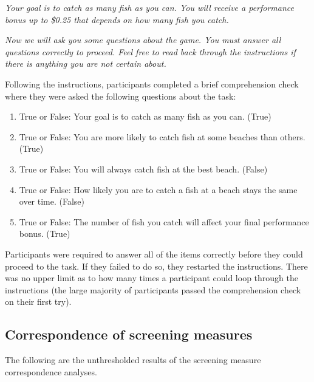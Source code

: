 \documentclass[a4paper,notitlepage,12pt]{article}
\begin{document}
\textit{Your goal is to catch as many fish as you can. You will receive a performance bonus up to \$0.25 that depends on how many fish you catch.}

\textit{Now we will ask you some questions about the game. You must answer all questions correctly to proceed. Feel free to read back through the instructions if there is anything you are not certain about.}

Following the instructions, participants completed a brief comprehension check where they were asked the following questions about the task:

\begin{enumerate}
    \item True or False: Your goal is to catch as many fish as you can. (True)
    \item True or False: You are more likely to catch fish at some beaches than others. (True)
    \item True or False: You will always catch fish at the best beach. (False)
    \item True or False: How likely you are to catch a fish at a beach stays the same over time. (False)
    \item True or False: The number of fish you catch will affect your final performance bonus. (True)
\end{enumerate}

Participants were required to answer all of the items correctly before they could proceed to the task. If they failed to do so, they restarted the instructions. There was no upper limit as to how many times a participant could loop through the instructions (the large majority of participants passed the comprehension check on their first try).

\subsection*{Correspondence of screening measures}

The following are the unthresholded results of the screening measure correspondence analyses.
\end{document}
